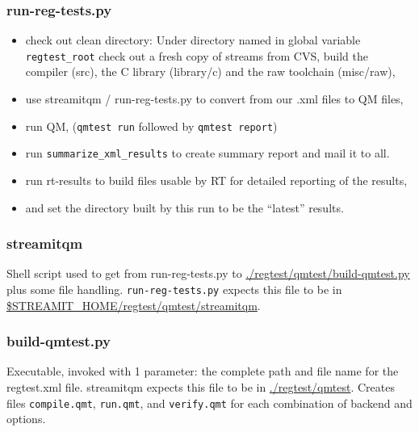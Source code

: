 \documentclass[11pt]{article}
\begin{document}

\subsubsection{run-reg-tests.py}
\begin{itemize}
\item check out clean directory:
 Under directory named in global variable {\tt regtest\_root} check
 out a fresh copy of streams from CVS, build the compiler (src), the C
 library (library/c) and the raw toolchain (misc/raw),
\item use streamitqm / run-reg-tests.py to convert from our .xml files to QM
  files,
\item run QM,  ({\tt qmtest run} followed by  {\tt qmtest report})
\item run {\tt summarize\_xml\_results} to create summary report and
  mail it to all. 
\item run rt-results to build files usable by RT for detailed
  reporting of the results,
\item and set the directory built by this run to be the ``latest'' results.
\end{itemize}

\subsubsection{streamitqm}
Shell script used to get from run-reg-tests.py to 
\url{./regtest/qmtest/build-qmtest.py}
plus some file handling.  {\tt run-reg-tests.py} expects this file to be in 
\url{$STREAMIT\_HOME/regtest/qmtest/streamitqm}. %

\subsubsection{build-qmtest.py}
Executable, invoked with 1 parameter: the complete path and file name for the 
regtest.xml file.  streamitqm expects this file to be in \url{./regtest/qmtest}.
Creates files {\tt compile.qmt}, {\tt run.qmt}, and {\tt verify.qmt}
for each combination of backend and options.
\end{document}
